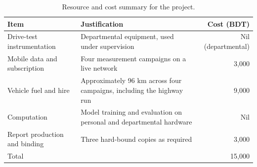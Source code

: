 \begin{table}[htbp]
\centering
\caption{Resource and cost summary for the project.}
\label{tab:6_6}
\vspace{0.4em}
\singlespacing
\small
\begin{tabularx}{\linewidth}{>{\raggedright\arraybackslash}p{4.4cm} X r}
\toprule
\textbf{Item} & \textbf{Justification} & \textbf{Cost (BDT)} \\
\midrule
Drive-test instrumentation & Departmental equipment, used under supervision & Nil (departmental) \\
Mobile data and subscription & Four measurement campaigns on a live network & 3,000 \\
Vehicle fuel and hire & Approximately 96 km across four campaigns, including the highway run & 9,000 \\
Computation & Model training and evaluation on personal and departmental hardware & Nil \\
Report production and binding & Three hard-bound copies as required & 3,000 \\
Total &  & 15,000 \\
\bottomrule
\end{tabularx}
\end{table}

